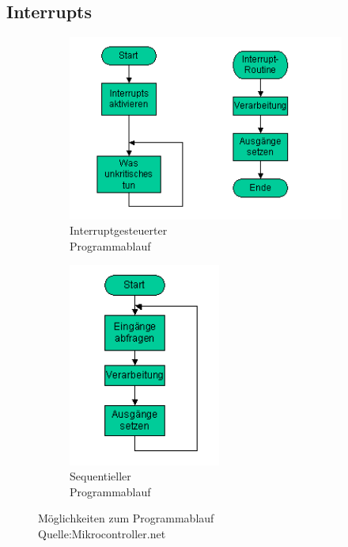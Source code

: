 \documentclass[a4paper, 11pt]{report}
\begin{document}
		\subsection{Interrupts}
		\begin{figure}[ht]
			\centering
			\begin{subfigure}{0.47\textwidth}
				\centering
				\includegraphics[width=1.1\textwidth]{rec/Interrupt_Programme.png}
				\caption{Interruptgesteuerter \\Programmablauf}
				\label{InterruptgesteuerterProgrammablauf}
			\end{subfigure}
			\begin{subfigure}{0.47\textwidth}
				\centering
				\includegraphics[width=0.55\textwidth]{rec/Sequentielle_Programme.png}
				\caption{Sequentieller \\Programmablauf}
				\label{SequentiellerProgrammablauf}
			\end{subfigure}
			\caption[Möglichkeiten zum Programmablauf]{Möglichkeiten zum Programmablauf
			\\Quelle:Mikrocontroller.net}
			\label{Programmablauf}
		\end{figure}
\end{document}
